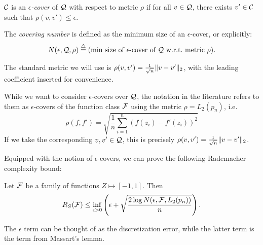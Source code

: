 \begin{definition}
$\mathcal C$ is an \emph{$\epsilon$-cover} of $\mathcal Q$ with respect to metric $\rho$ if for all $v\in \mathcal Q$, there exists $v'\in \mathcal C $ such that $\rho(v,v')\le \epsilon$.
\end{definition}

\begin{definition}
The \emph{covering number} is defined as the minimum size of an $\epsilon$-cover, or explicitly:
$$N(\epsilon, \mathcal Q, \rho) \overset \triangle = (\text{min size of $\epsilon$-cover of $\mathcal Q$ w.r.t.\ metric $\rho$}).$$
\end{definition}

The standard metric we will use is $\rho(v,v') = \frac 1 {\sqrt{n}} \|v-v'\|_2$, with the leading coefficient inserted for convenience.

\begin{remark}
While we want to consider $\epsilon$-covers over $\mathcal Q$, the notation in the literature refers to them as $\epsilon$-covers of the function class $\mathcal F$ using the metric $\rho = L_2(p_n)$, i.e.
\begin{equation}
\rho(f,f') = \sqrt{ \frac 1 n \sum_{i=1}^n (f(z_i) - f'(z_i))^2 }
\end{equation}
If we take the corresponding $v,v'\in \mathcal Q$, this is precisely $\rho(v,v') = \frac 1 {\sqrt{n}} \|v-v'\|_2$.
\end{remark}

Equipped with the notion of $\epsilon$-covers, we can prove the following Rademacher complexity bound:

\begin{theorem}
Let $\mathcal F$ be a family of functions $Z \mapsto [-1,1]$. Then
\begin{equation}
R_S(\mathcal F) \le \inf_{\epsilon > 0} \left( \epsilon + \sqrt{ \frac {2\log N(\epsilon, \mathcal F, L_2(p_n))} n } \right). \label{lec8:eqn:rc-covering-bd}
\end{equation}
\end{theorem}

The $\epsilon$ term can be thought of as the discretization error, while the latter term is the term from Massart's lemma.

